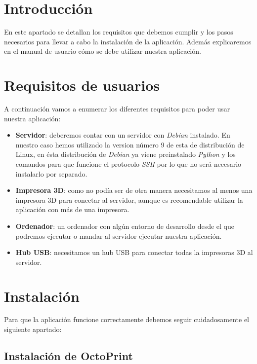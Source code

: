 
\section{Introducción}

En este apartado se detallan los requisitos que debemos cumplir y los pasos necesarios para llevar a cabo la instalación de la aplicación. Además explicaremos en el manual de usuario cómo se debe utilizar nuestra aplicación.

\section{Requisitos de usuarios}

A continuación vamos a enumerar los diferentes requisitos para poder usar nuestra aplicación:

\begin{itemize}
\item \textbf{Servidor}: deberemos contar con un servidor con \textit{Debian} instalado. En nuestro caso hemos utilizado la version número 9 de esta de distribución de Linux, en ésta distribución de \textit{Debian} ya viene preinstalado \textit{Python} y los comandos para que funcione el protocolo \textit{SSH} por lo que no será necesario instalarlo por separado.
\item \textbf{Impresora 3D}: como no podía ser de otra manera necesitamos al menos una impresora 3D para conectar al servidor, aunque es recomendable utilizar la aplicación con más de una impresora.
\item \textbf{Ordenador}: un ordenador con algún entorno de desarrollo desde el que podremos ejecutar o mandar al servidor ejecutar nuestra aplicación.
\item \textbf{Hub USB}: necesitamos un hub USB para conectar todas la impresoras 3D al servidor.
\end{itemize}

\section{Instalación}

Para que la aplicación funcione correctamente debemos seguir cuidadosamente el siguiente apartado:

\subsection{Instalación de OctoPrint}

